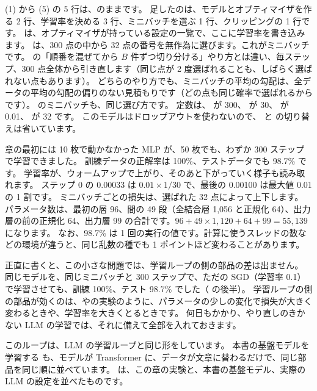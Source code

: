 
(1) から (5) の 5 行は、のままです。
足したのは、モデルとオプティマイザを作る 2 行、学習率を決める 3 行、ミニバッチを選ぶ 1 行、クリッピングの 1 行です。
 は、オプティマイザが持っている設定の一覧で、ここに学習率を書き込みます。
 は、300 点の中から 32 点の番号を無作為に選びます。これがミニバッチです。
の「順番を混ぜてから $B$ 件ずつ切り分ける」やり方とは違い、毎ステップ、300 点全体から引き直します（同じ点が 2 度選ばれることも、しばらく選ばれない点もあります）。
どちらのやり方でも、ミニバッチの平均の勾配は、全データの平均の勾配の偏りのない見積もりです（どの点も同じ確率で選ばれるからです）。
 のミニバッチも、同じ選び方です。
定数は、 が 300、 が 30、 が 0.01、 が 32 です。
このモデルはドロップアウトを使わないので、 と  の切り替えは省いています。


章の最初には 10 枚で動かなかった MLP が、50 枚でも、わずか 300 ステップで学習できました。
訓練データの正解率は 100\%、テストデータでも 98.7\% です。
学習率が、ウォームアップで上がり、そのあと下がっていく様子も読み取れます。
ステップ 0 の 0.00033 は $0.01\times1/30$ で、最後の 0.00100 は最大値 0.01 の 1 割です。
ミニバッチごとの損失は、選ばれた 32 点によって上下します。
パラメータ数は、最初の層 96、間の 49 段（全結合層 1,056 と正規化 64）、出力層の前の正規化 64、出力層 99 の合計です。$96+49\times1{,}120+64+99=55{,}139$ になります。
なお、98.7\% は 1 回の実行の値です。計算に使うスレッドの数などの環境が違うと、同じ乱数の種でも 1 ポイントほど変わることがあります。

正直に書くと、この小さな問題では、学習ループの側の部品の差は出ません。
同じモデルを、同じミニバッチと 300 ステップで、ただの SGD（学習率 0.1）で学習させても、訓練 100\%、テスト 98.7\% でした（ の後半）。
学習ループの側の部品が効くのは、やの実験のように、パラメータの少しの変化で損失が大きく変わるときや、学習率を大きくとるときです。
何日もかかり、やり直しのきかない LLM の学習では、それに備えて全部を入れておきます。

このループは、LLM の学習ループと同じ形をしています。
本書の基盤モデルを学習する  も、モデルが Transformer に、データが文章に替わるだけで、同じ部品を同じ順に並べています。
は、この章の実験と、本書の基盤モデル、実際の LLM の設定を並べたものです。


